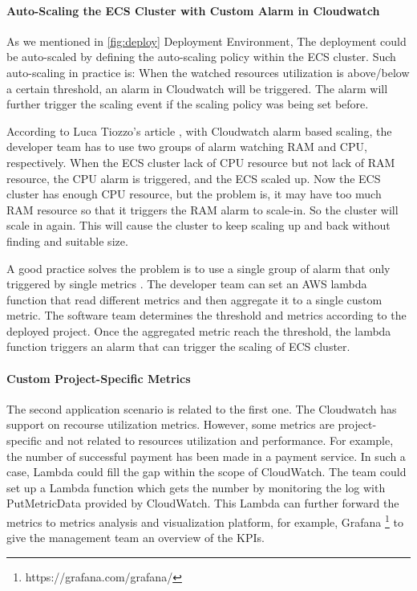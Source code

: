 \paragraph[]{Auto-Scaling the ECS Cluster with Custom Alarm in Cloudwatch}
As we mentioned in \ref{fig:deploy} Deployment Environment, The deployment could be auto-scaled by defining the auto-scaling policy within the ECS cluster. Such auto-scaling in practice is: When the watched resources utilization is above/below a certain threshold, an alarm in Cloudwatch will be triggered. The alarm will further trigger the scaling event if the scaling policy was being set before.
\par
According to Luca Tiozzo's article \cite{AWSECSho47:online}, with Cloudwatch alarm based scaling, the developer team has to use two groups of alarm watching RAM and CPU, respectively. When the ECS cluster lack of CPU resource but not lack of RAM resource, the CPU alarm is triggered, and the ECS scaled up. Now the ECS cluster has enough CPU resource, but the problem is, it may have too much RAM resource so that it triggers the RAM alarm to scale-in. So the cluster will scale in again. This will cause the cluster to keep scaling up and back without finding and suitable size.
\par
A good practice solves the problem is to use a single group of alarm that only triggered by single metrics \cite{AWSECSho47:online}. The developer team can set an AWS lambda function that read different metrics and then aggregate it to a single custom metric. The software team determines the threshold and metrics according to the deployed project. Once the aggregated metric reach the threshold, the lambda function triggers an alarm that can trigger the scaling of ECS cluster. 
\paragraph[]{Custom Project-Specific Metrics}
The second application scenario is related to the first one. The Cloudwatch has support on recourse utilization metrics. However, some metrics are project-specific and not related to resources utilization and performance. For example, the number of successful payment has been made in a payment service. In such a case, Lambda could fill the gap within the scope of CloudWatch. The team could set up a Lambda function which gets the number by monitoring the log with PutMetricData provided by CloudWatch. This Lambda can further forward the metrics to metrics analysis and visualization platform, for example, Grafana \footnote{https://grafana.com/grafana/} to give the management team an overview of the KPIs.
